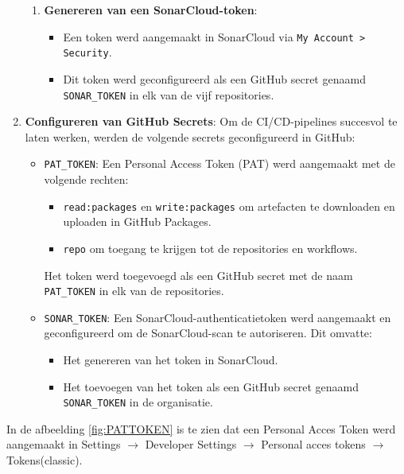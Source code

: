 \begin{enumerate}
\begin{enumerate}
        \item \textbf{Genereren van een SonarCloud-token}:
        \begin{itemize}
            \item Een token werd aangemaakt in SonarCloud via \texttt{My Account > Security}.
            \item Dit token werd geconfigureerd als een GitHub secret genaamd \texttt{SONAR\_TOKEN} in elk van de vijf repositories.
        \end{itemize}
    \end{enumerate}
    
    \item \textbf{Configureren van GitHub Secrets}:
    Om de CI/CD-pipelines succesvol te laten werken, werden de volgende secrets geconfigureerd in GitHub:
    \begin{itemize}
        \item \texttt{PAT\_TOKEN}: Een Personal Access Token (PAT) werd aangemaakt met de volgende rechten:
        \begin{itemize}
            \item \texttt{read:packages} en \texttt{write:packages} om artefacten te downloaden en uploaden in GitHub Packages.
            \item \texttt{repo} om toegang te krijgen tot de repositories en workflows.
        \end{itemize}
        Het token werd toegevoegd als een GitHub secret met de naam \texttt{PAT\_TOKEN} in elk van de repositories.
        
        \item \texttt{SONAR\_TOKEN}: Een SonarCloud-authenticatietoken werd aangemaakt en geconfigureerd om de SonarCloud-scan te autoriseren. Dit omvatte:
        \begin{itemize}
            \item Het genereren van het token in SonarCloud.
            \item Het toevoegen van het token als een GitHub secret genaamd \texttt{SONAR\_TOKEN} in de organisatie.
        \end{itemize}
    \end{itemize}
\end{enumerate}


In de afbeelding \ref{fig:PATTOKEN} is te zien dat een Personal Acces Token werd aangemaakt in Settings $\rightarrow$ Developer Settings $\rightarrow$ Personal acces tokens $\rightarrow$ Tokens(classic).

